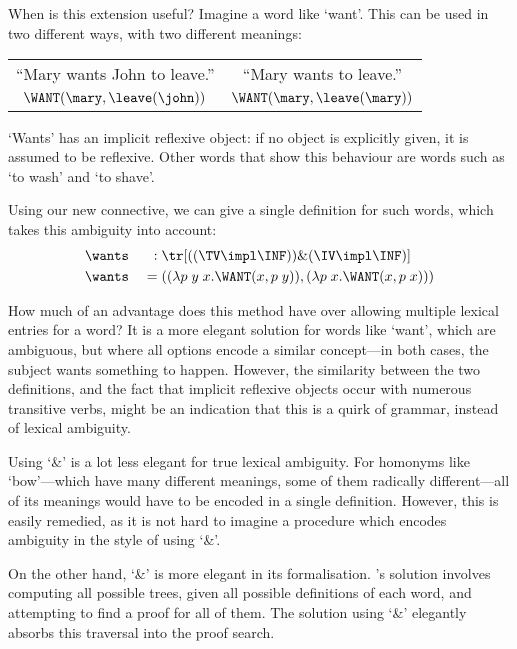 When is this extension useful? Imagine a word like `want'. This can be
used in two different ways, with two different meanings:\\
\begin{center}
  \vspace{-1\baselineskip}
  \renewcommand{\arraystretch}{1}
  \begin{tabular}{c c}
    ``Mary wants John to leave.'' & ``Mary wants to leave.''\\
    $\WANT(\mary,\leave(\john))$  & $\WANT(\mary,\leave(\mary))$
  \end{tabular}
\end{center}
`Wants' has an implicit reflexive object: if no object is explicitly
given, it is assumed to be reflexive. Other words that show this
behaviour are words such as `to wash' and `to shave'.

Using our new connective, we can give a single definition for such
words, which takes this ambiguity into account:
\begin{alignat*}{3}
  &\wants\;&:\;&\tr[((\TV\impl\INF))\&(\IV\impl\INF)]\\
  &\wants\;&=\;&((\lambda p\;y\;x.\WANT(x,p\;y)),(\lambda p\;x.\WANT(x,p\;x)))
\end{alignat*}

How much of an advantage does this method have over allowing multiple
lexical entries for a word? It is a more elegant solution for words
like `want', which are ambiguous, but where all options encode a
similar concept---in both cases, the subject wants something to
happen. However, the similarity between the two definitions, and the
fact that implicit reflexive objects occur with numerous transitive
verbs, might be an indication that this is a quirk of grammar, instead
of lexical ambiguity.

Using `\&' is a lot less elegant for true lexical ambiguity. For
homonyms like `bow'---which have many different meanings, some of
them radically different---all of its meanings would have to be
encoded in a single definition.
However, this is easily remedied, as it is not hard to imagine a
procedure which encodes ambiguity in the style of
\citeauthor{lambek1958} using `\&'.

On the other hand, `\&' is more elegant in its formalisation.
\citeauthor{lambek1958}'s solution involves computing all possible
trees, given all possible definitions of each word, and attempting to
find a proof for all of them. The solution using `\&' elegantly
absorbs this traversal into the proof search.
